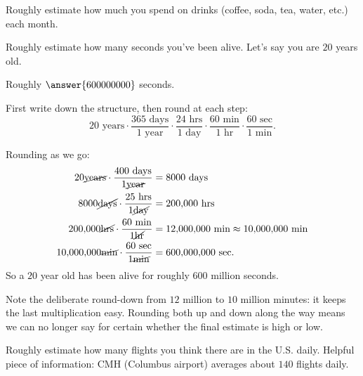 \documentclass[12pt]{ximera}
\begin{document}
\begin{problem}
Roughly estimate how much you spend on drinks (coffee, soda, tea, water, etc.) each
month.

\begin{freeResponse}
\end{freeResponse}
\end{problem}

\begin{problem}
Roughly estimate how many seconds you've been alive. Let's say you are $20$ years old.

Roughly $\answer{600000000}$ seconds.

\begin{hint}
First write down the structure, then round at each step:
\[
20 \text{ years} \cdot \frac{365 \text{ days}}{1 \text{ year}}
\cdot \frac{24 \text{ hrs}}{1 \text{ day}}
\cdot \frac{60 \text{ min}}{1 \text{ hr}}
\cdot \frac{60 \text{ sec}}{1 \text{ min}}.
\]
\end{hint}

\begin{solution}
Rounding as we go:
\[
\begin{aligned}
20 \cancel{\text{years}} \cdot \frac{400 \text{ days}}{1 \cancel{\text{year}}}
  &= 8000 \text{ days} \\
8000 \cancel{\text{days}} \cdot \frac{25 \text{ hrs}}{1 \cancel{\text{day}}}
  &= 200{,}000 \text{ hrs} \\
200{,}000 \cancel{\text{hrs}} \cdot \frac{60 \text{ min}}{1 \cancel{\text{hr}}}
  &= 12{,}000{,}000 \text{ min} \approx 10{,}000{,}000 \text{ min} \\
10{,}000{,}000 \cancel{\text{min}} \cdot \frac{60 \text{ sec}}{1 \cancel{\text{min}}}
  &= 600{,}000{,}000 \text{ sec}.
\end{aligned}
\]
So a $20$ year old has been alive for roughly $600$ million seconds.

Note the deliberate round-down from $12$ million to $10$ million minutes: it keeps the
last multiplication easy. Rounding both up and down along the way means we can no
longer say for certain whether the final estimate is high or low.
\end{solution}
\end{problem}

\begin{problem}
Roughly estimate how many flights you think there are in the U.S. daily. Helpful
piece of information: CMH (Columbus airport) averages about $140$ flights daily.

\begin{freeResponse}
\end{freeResponse}
\end{problem}
\end{document}

